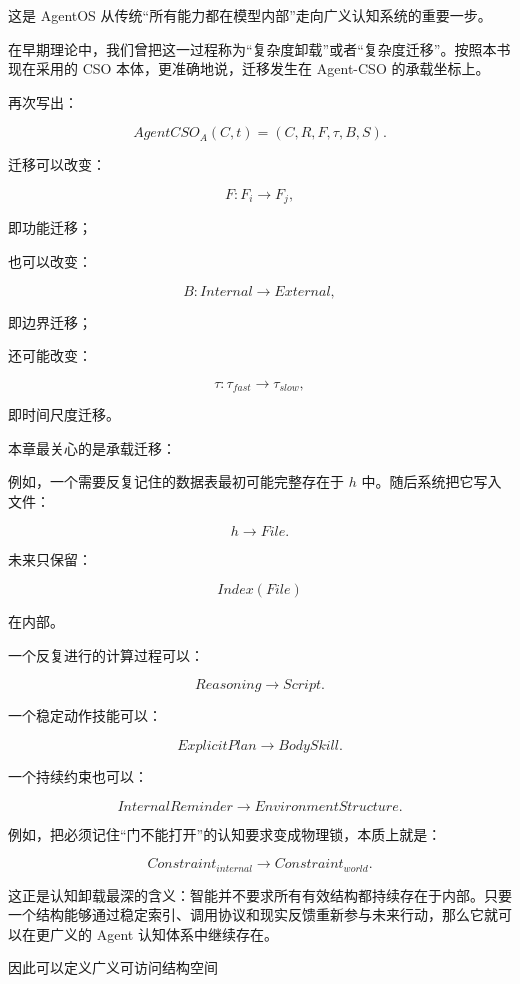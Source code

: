 这是 AgentOS 从传统“所有能力都在模型内部”走向广义认知系统的重要一步。

在早期理论中，我们曾把这一过程称为“复杂度卸载”或者“复杂度迁移”。按照本书现在采用的 CSO 本体，更准确地说，迁移发生在 Agent-CSO 的承载坐标上。

再次写出：

\[
AgentCSO_A(C,t)
=
(C,R,F,\tau,B,S).
\]

迁移可以改变：

\[
F:
F_i\rightarrow F_j,
\]

即功能迁移；

也可以改变：

\[
B:
Internal\rightarrow External,
\]

即边界迁移；

还可能改变：

\[
\tau:
\tau_{fast}
\rightarrow
\tau_{slow},
\]

即时间尺度迁移。

本章最关心的是承载迁移：

\begin{statementbox}
\centering
{}
\end{statementbox}

例如，一个需要反复记住的数据表最初可能完整存在于 $h$ 中。随后系统把它写入文件：

\[
h
\rightarrow
File.
\]

未来只保留：

\[
Index(File)
\]

在内部。

一个反复进行的计算过程可以：

\[
Reasoning
\rightarrow
Script.
\]

一个稳定动作技能可以：

\[
ExplicitPlan
\rightarrow
BodySkill.
\]

一个持续约束也可以：

\[
InternalReminder
\rightarrow
EnvironmentStructure.
\]

例如，把必须记住“门不能打开”的认知要求变成物理锁，本质上就是：

\[
Constraint_{internal}
\rightarrow
Constraint_{world}.
\]

这正是认知卸载最深的含义：智能并不要求所有有效结构都持续存在于内部。只要一个结构能够通过稳定索引、调用协议和现实反馈重新参与未来行动，那么它就可以在更广义的 Agent 认知体系中继续存在。

因此可以定义广义可访问结构空间

